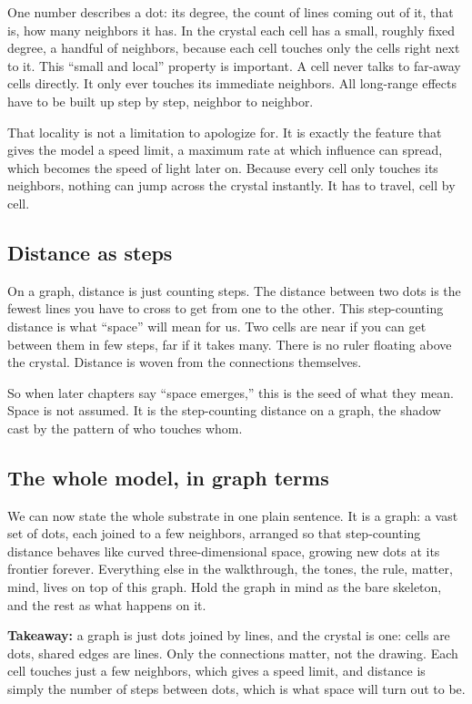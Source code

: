 One number describes a dot: its degree, the count of lines coming out of it, that is, how many neighbors it has. In the crystal each cell has a small, roughly fixed degree, a handful of neighbors, because each cell touches only the cells right next to it. This ``small and local'' property is important. A cell never talks to far-away cells directly. It only ever touches its immediate neighbors. All long-range effects have to be built up step by step, neighbor to neighbor.

That locality is not a limitation to apologize for. It is exactly the feature that gives the model a speed limit, a maximum rate at which influence can spread, which becomes the speed of light later on. Because every cell only touches its neighbors, nothing can jump across the crystal instantly. It has to travel, cell by cell.

\subsection{Distance as steps}

On a graph, distance is just counting steps. The distance between two dots is the fewest lines you have to cross to get from one to the other. This step-counting distance is what ``space'' will mean for us. Two cells are near if you can get between them in few steps, far if it takes many. There is no ruler floating above the crystal. Distance is woven from the connections themselves.

So when later chapters say ``space emerges,'' this is the seed of what they mean. Space is not assumed. It is the step-counting distance on a graph, the shadow cast by the pattern of who touches whom.

\subsection{The whole model, in graph terms}

We can now state the whole substrate in one plain sentence. It is a graph: a vast set of dots, each joined to a few neighbors, arranged so that step-counting distance behaves like curved three-dimensional space, growing new dots at its frontier forever. Everything else in the walkthrough, the tones, the rule, matter, mind, lives on top of this graph. Hold the graph in mind as the bare skeleton, and the rest as what happens on it.

\textbf{Takeaway:} a graph is just dots joined by lines, and the crystal is one: cells are dots, shared edges are lines. Only the connections matter, not the drawing. Each cell touches just a few neighbors, which gives a speed limit, and distance is simply the number of steps between dots, which is what space will turn out to be.
